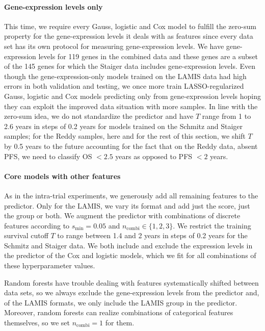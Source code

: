 \paragraph{Gene-expression levels only}
This time, we require every Gauss, logistic and Cox model to fulfill the zero-sum property for 
the gene-expression levels it deals with as features since every data set has its own protocol for 
measuring gene-expression levels. We have gene-expression levels for \num{119} genes in the 
combined data and these genes are a subset of the \num{145} genes for which the Staiger data 
includes gene-expression levels. Even though the gene-expression-only models trained on the LAMIS 
data had high errors in both validation and testing, we once more train LASSO-regularized Gauss, 
logistic and Cox models predicting only from gene-expression levels hoping they can exploit the 
improved data situation with more samples. In line with the zero-sum idea, we do not standardize 
the predictor and have $T$ range from \num{1} to \num{2.6} years in steps of \num{0.2} years for 
models trained on the Schmitz and Staiger samples; for the Reddy samples, here and for the rest 
of this section, we shift $T$ by
\num{0.5} years to the future accounting for the fact that on the Reddy data, absent PFS, we need 
to classify OS $< \num{2.5}$ years as opposed to PFS $< \num{2}$ years.

\paragraph{Core models with other features}
As in the intra-trial experiments, we generously add all remaining features to the predictor. Only 
for the LAMIS, we vary its format and add just the score, just the group or both. We augment the 
predictor with combinations of discrete features according to $s_\text{min} = \num{0.05}$ and 
$n_\text{combi} \in \{ 1, 2, 3 \}$. We restrict the training survival cutoff $T$ to range between 
\num{1.4} and \num{2} years in steps of \num{0.2} years for the Schmitz and Staiger data. We 
both include and exclude the expression levels in the predictor of the Cox and logistic 
models, which we fit for all combinations of these hyperparameter values.

Random forests have trouble dealing with features systematically shifted between data sets, so 
we always exclude the gene-expression levels from the predictor and, of the LAMIS formats, we only 
include the LAMIS group in the predictor. Moreover, random forests can realize combinations of 
categorical features themselves, so we set $n_\text{combi} = 1$ for them.

